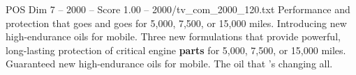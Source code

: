 \begin{textsample}{POS Dim 7 – 2000 – Score 1.00 – 2000/tv\_com\_2000\_120.txt}  \label{ex:f7_pos_054}
Performance and protection that goes and goes for 5,000, 7,500, or 15,000 miles.
Introducing new high-endurance oils for mobile.
Three new formulations that provide powerful, long-lasting protection of critical engine \textbf{parts} for 5,000, 7,500, or 15,000 miles.
Guaranteed new high-endurance oils for mobile.
The oil that 's changing all.

\end{textsample}
